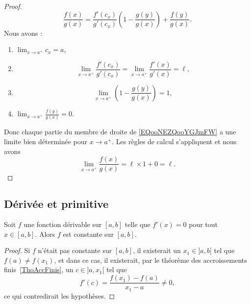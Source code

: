 \begin{proof}
	\begin{equation}        \label{EQooNEZQooYGJmFW}
		\frac{ f(x) }{ g(x) }=\frac{ f'(c_x) }{ g'(c_x) }\left( 1-\frac{ g(y) }{ g(x) } \right)+\frac{ f(y) }{ g(x) }.
	\end{equation}
	Nous avons :
	\begin{enumerate}
		\item
		      \( \lim_{x\to a^+} c_x=a\),
		\item
		      \begin{equation}
			      \lim_{x\to a^+}\frac{ f'(c_x) }{ g'(c_x) }=\lim_{x\to a^+} \frac{ f'(x) }{ g'(x) }=\ell,
		      \end{equation}
		\item
		      \begin{equation}
			      \lim_{x\to a^+} \left( 1-\frac{ g(y) }{ g(x) } \right)=1,
		      \end{equation}
		\item
		      \( \lim_{x\to a^+} \frac{ f(y) }{ g(x) }=0\).
	\end{enumerate}
	Donc chaque partie du membre de droite de \eqref{EQooNEZQooYGJmFW} a une limite bien déterminée pour \( x\to a^+\). Les règles de calcul s'appliquent et nous avons
	\begin{equation}
		\lim_{x\to a^+} \frac{ f(x) }{ g(x) }=\ell\times 1+0=\ell.
	\end{equation}
\end{proof}

\subsection{Dérivée et primitive}

\begin{corollary}       \label{CORooEOERooYprteX}
	Soit \( f\) une fonction dérivable sur \( [a,b]\) telle que \( f'(x) = 0\) pour tout \( x \in [a,b]\). Alors \( f\) est constante sur \( [a,b]\).
\end{corollary}

\begin{proof}
	Si \( f\) n'était pas constante sur \( [a,b]\), il existerait un \( x_1\in ]a,b[\) tel que \( f(a)\neq f(x_1)\), et dans ce cas, il existerait, par le théorème des accroissements finis~\ref{ThoAccFinis}, un \( c\in]a,x_1[\) tel que
	\begin{equation}
		f'(c)=\frac{ f(x_1)-f(a) }{ x_1-a }\neq 0,
	\end{equation}
	ce qui contredirait les hypothèses.
\end{proof}

